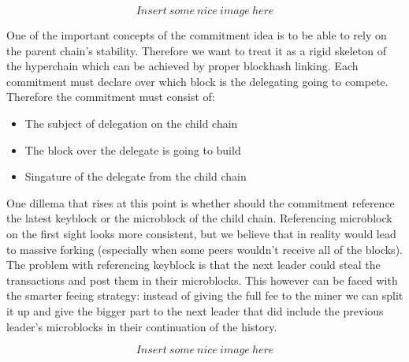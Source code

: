 $$Insert\ some\ nice\ image\ here$$

One of the important concepts of the commitment idea is to be able to rely on
the parent chain's stability. Therefore we want to treat it as a rigid skeleton
of the hyperchain which can be achieved by proper blockhash linking. Each
commitment must declare over which block is the delegating going to compete.
Therefore the commitment must consist of:
\begin{itemize}
\item The subject of delegation on the child chain
\item The block over the delegate is going to build
\item Singature of the delegate from the child chain
\end{itemize}

One dillema that rises at this point is whether should the commitment reference
the latest keyblock or the microblock of the child chain. Referencing microblock
on the first sight looks more consistent, but we believe that in reality would
lead to massive forking (especially when some peers wouldn't receive all of the
blocks). The problem with referencing keyblock is that the next leader could
steal the transactions and post them in their microblocks. This however can be
faced with the smarter feeing strategy: instead of giving the full fee to the
miner we can split it up and give the bigger part to the next leader that did
include the previous leader's microblocks in their continuation of the history.

$$Insert\ some\ nice\ image\ here$$


